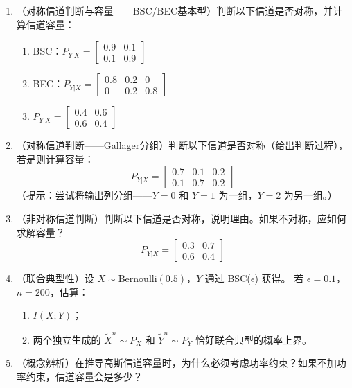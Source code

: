 \documentclass[12pt,a4paper]{ctexart}
\begin{document}
\begin{enumerate}[label=\textbf{\arabic*.}, leftmargin=*]

\item （对称信道判断与容量——BSC/BEC基本型）判断以下信道是否对称，并计算信道容量：
\begin{enumerate}
  \item BSC：$P_{Y|X} = \begin{bmatrix} 0.9 & 0.1 \\ 0.1 & 0.9 \end{bmatrix}$
  \item BEC：$P_{Y|X} = \begin{bmatrix} 0.8 & 0.2 & 0 \\ 0 & 0.2 & 0.8 \end{bmatrix}$
  \item $P_{Y|X} = \begin{bmatrix} 0.4 & 0.6 \\ 0.6 & 0.4 \end{bmatrix}$
\end{enumerate}

\item （对称信道判断——Gallager分组）判断以下信道是否对称（给出判断过程），若是则计算容量：
\[
P_{Y|X} = \begin{bmatrix}
0.7 & 0.1 & 0.2 \\
0.1 & 0.7 & 0.2
\end{bmatrix}
\]
（提示：尝试将输出列分组——$Y=0$ 和 $Y=1$ 为一组，$Y=2$ 为另一组。）

\item （非对称信道判断）判断以下信道是否对称，说明理由。如果不对称，应如何求解容量？
\[
P_{Y|X} = \begin{bmatrix}
0.3 & 0.7 \\
0.6 & 0.4
\end{bmatrix}
\]

\item （联合典型性）设 $X \sim \mathrm{Bernoulli}(0.5)$，$Y$ 通过 BSC($\epsilon$) 获得。
若 $\epsilon=0.1$，$n=200$，估算：
\begin{enumerate}
  \item $I(X;Y)$；
  \item 两个独立生成的 $\tilde{X}^n \sim P_X$ 和 $\tilde{Y}^n \sim P_Y$ 恰好联合典型的概率上界。
\end{enumerate}

\item （概念辨析）在推导高斯信道容量时，为什么必须考虑功率约束？如果不加功率约束，信道容量会是多少？
\end{enumerate}
\end{document}
